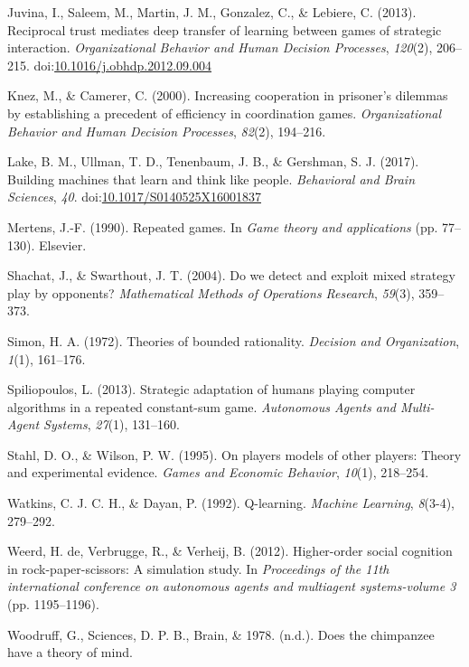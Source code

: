 \documentclass[man,floatsintext]{apa6}
\begin{document}
\leavevmode\hypertarget{ref-Juvina2013}{}%
Juvina, I., Saleem, M., Martin, J. M., Gonzalez, C., \& Lebiere, C. (2013). Reciprocal trust mediates deep transfer of learning between games of strategic interaction. \emph{Organizational Behavior and Human Decision Processes}, \emph{120}(2), 206--215. doi:\href{https://doi.org/10.1016/j.obhdp.2012.09.004}{10.1016/j.obhdp.2012.09.004}

\leavevmode\hypertarget{ref-knez2000increasing}{}%
Knez, M., \& Camerer, C. (2000). Increasing cooperation in prisoner's dilemmas by establishing a precedent of efficiency in coordination games. \emph{Organizational Behavior and Human Decision Processes}, \emph{82}(2), 194--216.

\leavevmode\hypertarget{ref-Lake2017}{}%
Lake, B. M., Ullman, T. D., Tenenbaum, J. B., \& Gershman, S. J. (2017). Building machines that learn and think like people. \emph{Behavioral and Brain Sciences}, \emph{40}. doi:\href{https://doi.org/10.1017/S0140525X16001837}{10.1017/S0140525X16001837}

\leavevmode\hypertarget{ref-mertens1990repeated}{}%
Mertens, J.-F. (1990). Repeated games. In \emph{Game theory and applications} (pp. 77--130). Elsevier.

\leavevmode\hypertarget{ref-shachat2004we}{}%
Shachat, J., \& Swarthout, J. T. (2004). Do we detect and exploit mixed strategy play by opponents? \emph{Mathematical Methods of Operations Research}, \emph{59}(3), 359--373.

\leavevmode\hypertarget{ref-simon1972theories}{}%
Simon, H. A. (1972). Theories of bounded rationality. \emph{Decision and Organization}, \emph{1}(1), 161--176.

\leavevmode\hypertarget{ref-spiliopoulos2013strategic}{}%
Spiliopoulos, L. (2013). Strategic adaptation of humans playing computer algorithms in a repeated constant-sum game. \emph{Autonomous Agents and Multi-Agent Systems}, \emph{27}(1), 131--160.

\leavevmode\hypertarget{ref-stahl1995players}{}%
Stahl, D. O., \& Wilson, P. W. (1995). On players models of other players: Theory and experimental evidence. \emph{Games and Economic Behavior}, \emph{10}(1), 218--254.

\leavevmode\hypertarget{ref-watkins1992q}{}%
Watkins, C. J. C. H., \& Dayan, P. (1992). Q-learning. \emph{Machine Learning}, \emph{8}(3-4), 279--292.

\leavevmode\hypertarget{ref-de2012higher}{}%
Weerd, H. de, Verbrugge, R., \& Verheij, B. (2012). Higher-order social cognition in rock-paper-scissors: A simulation study. In \emph{Proceedings of the 11th international conference on autonomous agents and multiagent systems-volume 3} (pp. 1195--1196).

\leavevmode\hypertarget{ref-Woodruff}{}%
Woodruff, G., Sciences, D. P. B., Brain, \& 1978. (n.d.). Does the chimpanzee have a theory of mind.

\endgroup
\end{document}
